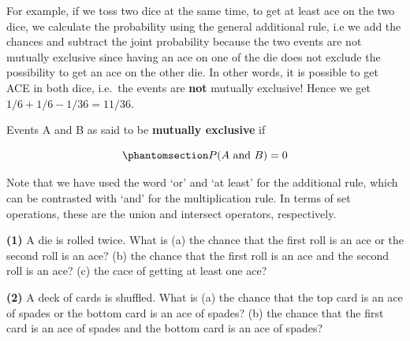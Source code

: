 \documentclass[
  letterpaper,
  DIV=11,
  numbers=noendperiod]{scrreprt}
\begin{document}
For example, if we toss two dice at the same time, to get at least ace
on the two dice, we calculate the probability using the general
additional rule, i.e we add the chances and subtract the joint
probability because the two events are not mutually exclusive since
having an ace on one of the die does not exclude the possibility to get
an ace on the other die. In other words, it is possible to get ACE in
both dice, i.e.~the events are \textbf{not} mutually exclusive! Hence we
get \(1/6 + 1/6 - 1/36 = 11/36.\)

\begin{tcolorbox}[enhanced jigsaw, coltitle=black, colbacktitle=quarto-callout-important-color!10!white, left=2mm, bottomrule=.15mm, bottomtitle=1mm, colback=white, titlerule=0mm, colframe=quarto-callout-important-color-frame, breakable, leftrule=.75mm, toptitle=1mm, opacitybacktitle=0.6, rightrule=.15mm, title=\textcolor{quarto-callout-important-color}{\faExclamation}\hspace{0.5em}{Mutually exclusive events}, arc=.35mm, opacityback=0, toprule=.15mm]

Events A and B as said to be \textbf{mutually exclusive} if

\begin{equation}\phantomsection\label{eq-muutually-exclusive}{
P(A \text{ and } B) = 0
}\end{equation}

\end{tcolorbox}

Note that we have used the word `or' and `at least' for the additional
rule, which can be contrasted with `and' for the multiplication rule. In
terms of set operations, these are the union and intersect operators,
respectively.

\begin{tcolorbox}[enhanced jigsaw, coltitle=black, colbacktitle=quarto-callout-important-color!10!white, left=2mm, bottomrule=.15mm, bottomtitle=1mm, colback=white, titlerule=0mm, colframe=quarto-callout-important-color-frame, breakable, leftrule=.75mm, toptitle=1mm, opacitybacktitle=0.6, rightrule=.15mm, title=\textcolor{quarto-callout-important-color}{\faExclamation}\hspace{0.5em}{Try these.}, arc=.35mm, opacityback=0, toprule=.15mm]

\textbf{(1)} A die is rolled twice. What is (a) the chance that the
first roll is an ace or the second roll is an ace? (b) the chance that
the first roll is an ace and the second roll is an ace? (c) the cace of
getting at least one ace?

\textbf{(2)} A deck of cards is shuffled. What is (a) the chance that
the top card is an ace of spades or the bottom card is an ace of spades?
(b) the chance that the first card is an ace of spades and the bottom
card is an ace of spades?

\end{tcolorbox}
\end{document}
